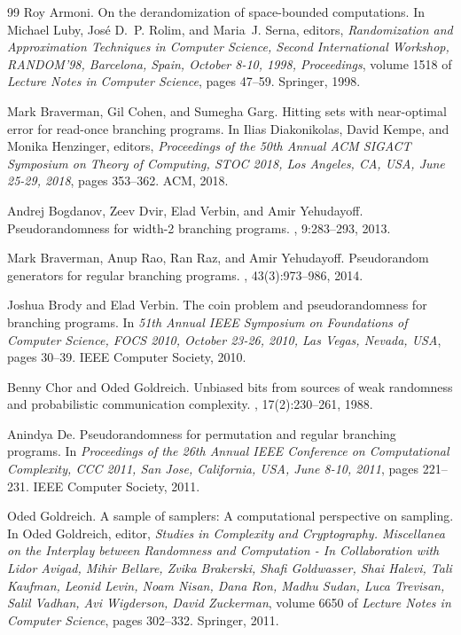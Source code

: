 \documentclass[10pt,a4paper]{article}
\begin{document}
\begin{thebibliography}{99}
Roy Armoni.
\newblock On the derandomization of space-bounded computations.
\newblock In Michael Luby, Jos{\'{e}} D.~P. Rolim, and Maria~J. Serna, editors,
  {\em Randomization and Approximation Techniques in Computer Science, Second
  International Workshop, RANDOM'98, Barcelona, Spain, October 8-10, 1998,
  Proceedings}, volume 1518 of {\em Lecture Notes in Computer Science}, pages
  47--59. Springer, 1998.

Mark Braverman, Gil Cohen, and Sumegha Garg.
\newblock Hitting sets with near-optimal error for read-once branching
  programs.
\newblock In Ilias Diakonikolas, David Kempe, and Monika Henzinger, editors,
  {\em Proceedings of the 50th Annual {ACM} {SIGACT} Symposium on Theory of
  Computing, {STOC} 2018, Los Angeles, CA, USA, June 25-29, 2018}, pages
  353--362. {ACM}, 2018.

Andrej Bogdanov, Zeev Dvir, Elad Verbin, and Amir Yehudayoff.
\newblock Pseudorandomness for width-2 branching programs.
, 9:283--293, 2013.

Mark Braverman, Anup Rao, Ran Raz, and Amir Yehudayoff.
\newblock Pseudorandom generators for regular branching programs.
, 43(3):973--986, 2014.

Joshua Brody and Elad Verbin.
\newblock The coin problem and pseudorandomness for branching programs.
\newblock In {\em 51th Annual {IEEE} Symposium on Foundations of Computer
  Science, {FOCS} 2010, October 23-26, 2010, Las Vegas, Nevada, {USA}}, pages
  30--39. {IEEE} Computer Society, 2010.

Benny Chor and Oded Goldreich.
\newblock Unbiased bits from sources of weak randomness and probabilistic
  communication complexity.
, 17(2):230--261, 1988.

Anindya De.
\newblock Pseudorandomness for permutation and regular branching programs.
\newblock In {\em Proceedings of the 26th Annual {IEEE} Conference on
  Computational Complexity, {CCC} 2011, San Jose, California, USA, June 8-10,
  2011}, pages 221--231. {IEEE} Computer Society, 2011.

Oded Goldreich.
\newblock A sample of samplers: {A} computational perspective on sampling.
\newblock In Oded Goldreich, editor, {\em Studies in Complexity and
  Cryptography. Miscellanea on the Interplay between Randomness and Computation
  - In Collaboration with Lidor Avigad, Mihir Bellare, Zvika Brakerski, Shafi
  Goldwasser, Shai Halevi, Tali Kaufman, Leonid Levin, Noam Nisan, Dana Ron,
  Madhu Sudan, Luca Trevisan, Salil Vadhan, Avi Wigderson, David Zuckerman},
  volume 6650 of {\em Lecture Notes in Computer Science}, pages 302--332.
  Springer, 2011.


\end{thebibliography}
\end{document}
